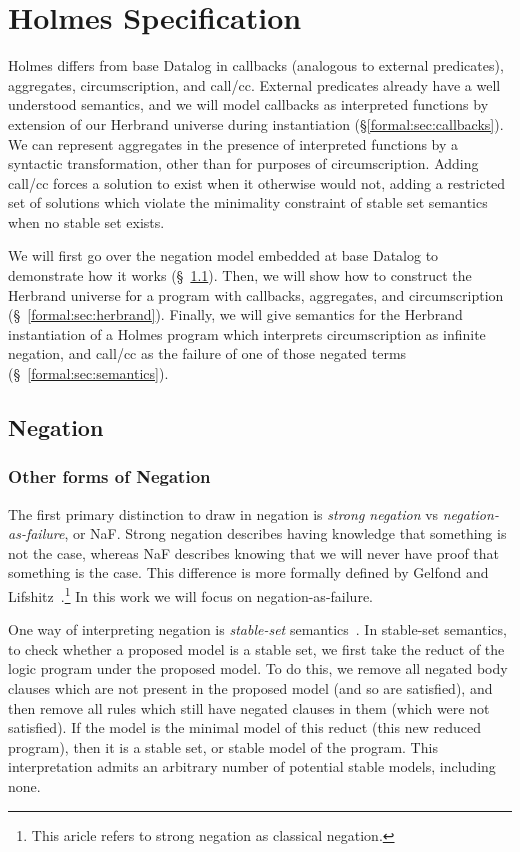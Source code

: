
\chapter{Holmes Specification}
\label{chap:formal}
Holmes differs from base Datalog in callbacks (analogous to external predicates), aggregates, circumscription, and call/cc.
External predicates already have a well understood semantics, and we will model callbacks as interpreted functions by extension of our Herbrand universe during instantiation (\S \ref{formal:sec:callbacks}).
We can represent aggregates in the presence of interpreted functions by a syntactic transformation, other than for purposes of circumscription.
Adding call/cc forces a solution to exist when it otherwise would not, adding a restricted set of solutions which violate the minimality constraint of stable set semantics when no stable set exists.

We will first go over the negation model embedded at base Datalog to demonstrate how it works (\S~\ref{formal:sec:negation}).
Then, we will show how to construct the Herbrand universe for a program with callbacks, aggregates, and circumscription (\S~\ref{formal:sec:herbrand}).
Finally, we will give semantics for the Herbrand instantiation of a Holmes program which interprets circumscription as infinite negation, and call/cc as the failure of one of those negated terms (\S~\ref{formal:sec:semantics}).
\section{Negation}
\label{formal:sec:negation}
\subsection{Other forms of Negation}
\label{formal:sec:otherneg}
The first primary distinction to draw in negation is \emph{strong negation} vs \emph{negation-as-failure}, or NaF.
Strong negation describes having knowledge that something is not the case, whereas NaF describes knowing that we will never have proof that something is the case.
This difference is more formally defined by Gelfond and Lifshitz~\cite{strongneg}.\footnote{
This aricle refers to strong negation as classical negation.
}
In this work we will focus on negation-as-failure.

One way of interpreting negation is \emph{stable-set} semantics~\cite{stablemodel}.
In stable-set semantics, to check whether a proposed model is a stable set, we first take the reduct of the logic program under the proposed model.
To do this, we remove all negated body clauses which are not present in the proposed model (and so are satisfied), and then remove all rules which still have negated clauses in them (which were not satisfied).
If the model is the minimal model of this reduct (this new reduced program), then it is a stable set, or stable model of the program.
This interpretation admits an arbitrary number of potential stable models, including none.

